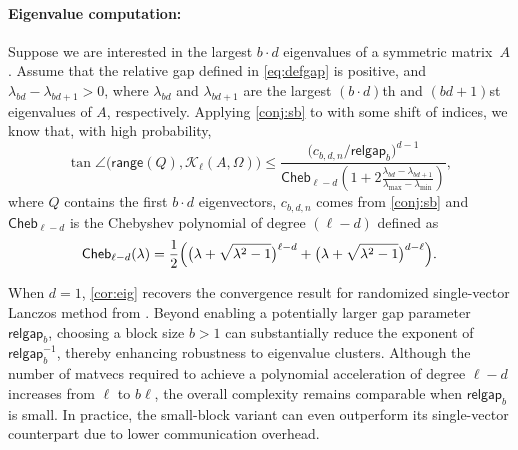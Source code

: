 \documentclass{article}
\newcommand{\range}{\mathsf{range}}
\newcommand{\gap}{\mathsf{relgap}}
\newcommand{\cheb}{\mathsf{Cheb}}
\begin{document}
\paragraph{Eigenvalue computation:}
Suppose we are interested in the largest $b\cdot d$ eigenvalues of a symmetric matrix~$A$. Assume that the relative gap defined in \cref{eq:defgap} is positive, and $\lambda_{bd}-\lambda_{bd+1}>0$, where $\lambda_{bd}$ and $\lambda_{bd+1}$ are the largest $(b\cdot d)$th and $(bd+1)$st eigenvalues of $A$, respectively. Applying \cref{conj:sb} to \cite[Lem.~3.4]{kressner2024randomized} with some shift of indices, we know that, with high probability,
\begin{equation}
    \label{cor:eig}
        \tan\angle\bigl(\range(Q),\mathcal{K}_{\ell}(A,\Omega)\bigr) \leq \frac{\bigl(c_{b,d,n}/\gap_{b}\bigr)^{d-1}}{\cheb_{\ell-d}(1+
        2\frac{\lambda_{bd}-\lambda_{bd+1}}{\lambda_{\max}-\lambda_{\min}})},
\end{equation}
where $Q$ contains the first $b\cdot d$ eigenvectors, $c_{b,d,n}$ comes from \cref{conj:sb} and $\cheb_{\ell-d}$ is the Chebyshev polynomial of degree $(\ell-d)$ defined as 
\begin{equation*}
    \cheb_{\ell-d}(\lambda) = \frac{1}{2}\Bigl(\bigl(\lambda+\sqrt{\lambda^{2}-1}\bigr)^{\ell-d}+\bigl(\lambda+\sqrt{\lambda^{2}-1}\bigl)^{d-\ell}\Bigr).
\end{equation*}

When $d = 1$, \cref{cor:eig} recovers the convergence result for randomized single-vector Lanczos method from \cite[Thm.~3.1]{kressner2024randomized}. Beyond enabling a potentially larger gap parameter $\gap_{b}$, choosing a block size $b > 1$ can substantially reduce the exponent of $\gap_{b}^{-1}$, thereby enhancing robustness to eigenvalue clusters. Although the number of matvecs required to achieve a polynomial acceleration of degree $\ell - d$ increases from $\ell$ to $b\ell$, the overall complexity remains comparable when $\gap_{b}$ is small. In practice, the small-block variant can even outperform its single-vector counterpart due to lower communication overhead.
\end{document}
